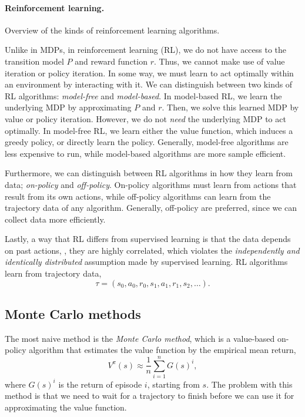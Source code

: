 \paragraph{Reinforcement learning.}

\begin{marginfigure}[5cm]
    \centering
    \caption{Overview of the kinds of reinforcement learning algorithms.}
    \label{fig:rl-overview}
\end{marginfigure}

Unlike in MDPs, in reinforcement learning (RL), we do not have access to the transition model $P$
and reward function $r$. Thus, we cannot make use of value iteration or policy iteration. In some
way, we must learn to act optimally within an environment by interacting with it. We can
distinguish between two kinds of RL algorithms: \textit{model-free} and \textit{model-based}. In
model-based RL, we learn the underlying MDP by approximating $P$ and $r$. Then, we solve this
learned MDP by value or policy iteration. However, we do not \textit{need} the underlying MDP to
act optimally. In model-free RL, we learn either the value function, which induces a greedy policy,
or directly learn the policy. Generally, model-free algorithms are less expensive to run, while
model-based algorithms are more sample efficient.

Furthermore, we can distinguish between RL algorithms in how they learn from data;
\textit{on-policy} and \textit{off-policy}. On-policy algorithms must learn from actions that
result from its own actions, while off-policy algorithms can learn from the trajectory data of any
algorithm. Generally, off-policy are preferred, since we can collect data more efficiently.

Lastly, a way that RL differs from supervised learning is that the data depends on past actions,
\ie, they are highly correlated, which violates the \textit{independently and identically
    distributed} assumption made by supervised learning. RL algorithms learn from trajectory data, \[
    \tau = (s_0, a_0, r_0, s_1, a_1, r_1, s_2, \ldots).
\]

\subsection{Monte Carlo methods}

The most naive method is the \textit{Monte Carlo method}, which is a value-based on-policy
algorithm that estimates the value function by the empirical mean return, \[
    V^\pi(s) \approx \frac{1}{n} \sum_{i=1}^{n} G(s)^i,
\]
where $G(s)^i$ is the return of episode $i$, starting from $s$. The problem with this method is
that we need to wait for a trajectory to finish before we can use it for approximating the value
function.

